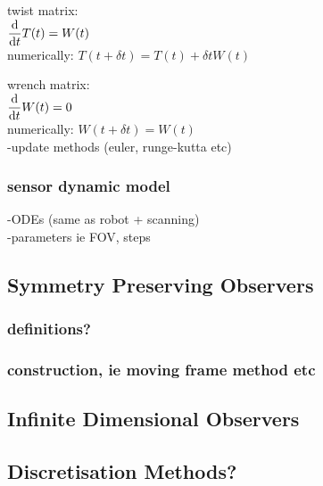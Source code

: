 		twist matrix:\\
		$ \dfrac{\textnormal{d}}{\textnormal{d}t}T(t)=W(t)$\\
		numerically: $T(t+\delta t) = T(t) + \delta tW(t)$
		
		wrench matrix:\\
		$ \dfrac{\textnormal{d}}{\textnormal{d}t}W(t)=0$\\
		numerically: $W(t+\delta t) = W(t)$\\
		-update methods (euler, runge-kutta etc)
	\subsubsection{sensor dynamic model}
		-ODEs (same as robot + scanning)\\
		-parameters ie FOV, steps
\subsection{Symmetry Preserving Observers}
	\subsubsection{definitions?}
	\subsubsection{construction, ie moving frame method etc}
\subsection{Infinite Dimensional Observers}
\subsection{Discretisation Methods?}